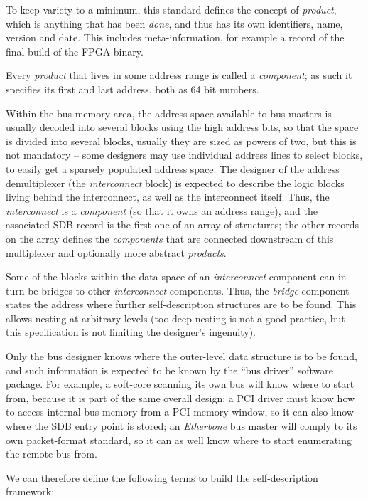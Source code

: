 \documentclass[a4paper, 12pt]{article}
\begin{document}
To keep variety to a minimum, this standard defines the concept of
\textit{product}, which is anything that has been \textit{done}, and thus has
its own identifiers, name, version and date.  This includes
meta-information, for example a record of the final build of the
FPGA binary.

Every \textit{product} that lives in some address range is called a
\textit{component}; as such it specifies its first and last address, both as
64 bit numbers.

Within the bus memory area, the address space available to bus masters
is usually decoded into several blocks using the high address bits, so
that the space is divided into several blocks, usually they are sized
as powers of two, but this is not mandatory -- some designers may use
individual address lines to select blocks, to easily get a sparsely
populated address space.  The designer of the address demultiplexer
(the \textit{interconnect} block) is expected to describe the
logic blocks living behind the interconnect, as well as the
interconnect itself. Thus, the \textit{interconnect} is a \textit{component}
(so that it owns an address range), and the associated SDB record is the first
one of an array of structures; the other records on the array
defines the \textit{components} that are connected downstream of this multiplexer
and optionally more abstract \textit{products}.

Some of the blocks within the data space of an \textit{interconnect}
component can in turn be
bridges to other \textit{interconnect} components.  Thus, the \textit{bridge}
component states the address where further self-description structures are to
be found. This allows nesting at arbitrary levels (too deep nesting is
not a good practice, but this specification is not limiting the
designer's ingenuity).

Only the bus designer knows where the outer-level data structure is to
be found, and such information is expected to be known by the ``bus
driver'' software package.  For example, a soft-core scanning its own
bus will know where to start from, because it is part of the same
overall design; a PCI driver must know how to access internal bus
memory from a PCI memory window, so it can also know where the
SDB entry point is stored; an \textit{Etherbone} bus master will
comply to its own packet-format standard, so it can as well know
where to start enumerating the remote bus from.

We can therefore define the following terms to build the
self-description framework:
\end{document}
